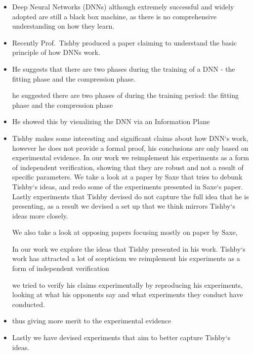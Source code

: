 
\begin{itemize}
  \item{
      Deep Neural Networks (DNNs) although extremely successful and widely
      adopted are still a black box machine, as there is no comprehensive
      understanding on how they learn.
    }
  \item{
      Recently Prof.\ Tishby produced a paper claiming to understand the basic
      principle of how DNNs work.
    }
  \item{
      He suggests that there are two phases during the training of a DNN - the
      fitting phase and the compression phase. 

      he suggested there are two phases of during the training period: the
      fitting phase and the compression phase
    }
  \item{
      He showed this by visualizing the DNN via an Information Plane
    }
  \item{
      Tishby makes some interesting and significant claims about how DNN`s work,
      however he does not provide a formal proof, his conclusions are only based
      on experimental evidence. In our work we reimplement his experiments as a
      form of independent verification, showing that they are robust and not a
      result of specific parameters. We take a look at a paper by Saxe that
      tries to debunk Tishby`s ideas, and redo some of the experiments presented
      in Saxe`s paper. Lastly experiments that Tishby devised do not capture the
      full idea that he is presenting, as a result we devised a set up that we
      think mirrors Tishby`s ideas more closely.
      
      We also take a look at opposing papers
      focusing mostly on paper by Saxe, 

      In our work we explore the ideas that Tishby presented in his work.
      Tishby`s work has attracted a lot of scepticism we reimplement his
      experiments as a form of independent verification 
      

      we tried to verify his claims experimentally by reproducing his
      experiments, looking at what his opponents say and what experiments they
      conduct have conducted.
    }
  \item{
      thus giving more merit to the experimental evidence
    }
  \item{
      Lastly we have devised experiments that aim to better capture Tishby`s
      ideas.
    }
\end{itemize}

